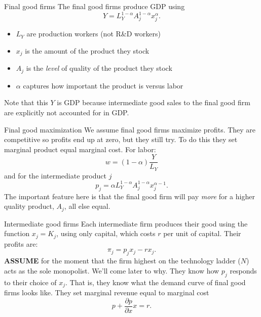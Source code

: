 \begin{frame}{Final good firms}
The final good firms produce GDP using
\begin{equation}
	Y = L_Y^{1-\alpha} A_j^{1-\alpha} x_j^{\alpha}. \label{EQ_Y_schump}
\end{equation}
\begin{itemize}
	\item $L_Y$ are production workers (not R\&D workers)
	\item $x_j$ is the amount of the product they stock
	\item $A_j$ is the \textit{level} of quality of the product they stock
	\item $\alpha$ captures how important the product is versus labor
\end{itemize}
Note that this $Y$ is GDP because intermediate good sales to the final good firm are explicitly not accounted for in GDP. 
\end{frame}

\begin{frame}{Final good maximization}
We assume final good firms maximize profits. They are competitive so profits end up at zero, but they still try. To do this they set marginal product equal marginal cost. For labor:
\begin{equation}
	w = (1-\alpha)\frac{Y}{L_Y} \label{EQ_w_schump}
\end{equation}
and for the intermediate product $j$
\begin{equation}
	p_j = \alpha L_Y^{1-\alpha} A_j^{1-\alpha} x_j^{\alpha-1}. \label{EQ_pN_schump}
\end{equation}
The important feature here is that the final good firm will pay \textit{more} for a higher quality product, $A_j$, all else equal.
\end{frame}

\begin{frame}{Intermediate good firms}
Each intermediate firm produces their good using the function $x_j = K_j$, using only capital, which costs $r$ per unit of capital. Their profits are:
\begin{equation}
	\pi_j = p_j x_j - r x_j. \nonumber
\end{equation}
\vspace{.25in}
\textbf{ASSUME} for the moment that the firm highest on the technology ladder ($N$) acts as the sole monopolist. We'll come later to why.
\vspace{.25in}
They know how $p_j$ responds to their choice of $x_j$. That is, they know what the demand curve of final good firms looks like. They set marginal revenue equal to marginal cost
\begin{equation}
	p + \frac{\partial p}{\partial x}x = r. \nonumber
\end{equation}
\end{frame}

